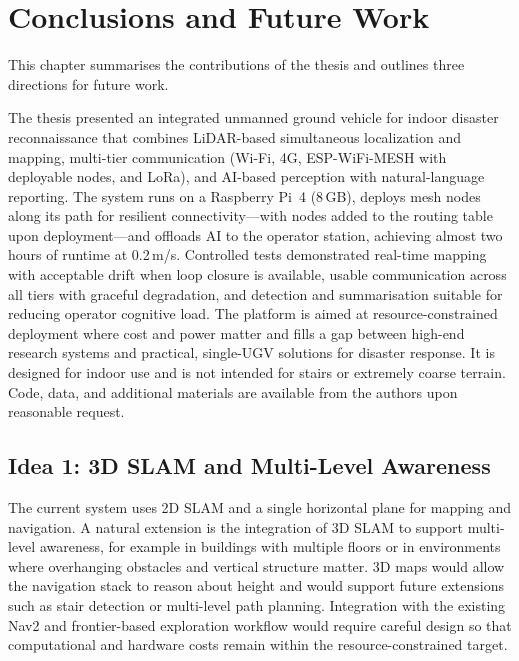 
\chapter{Conclusions and Future Work}

This chapter summarises the contributions of the thesis and outlines three directions for future work.

The thesis presented an integrated unmanned ground vehicle for indoor disaster reconnaissance that combines LiDAR-based simultaneous localization and mapping, multi-tier communication (Wi-Fi, 4G, ESP-WiFi-MESH with deployable nodes, and LoRa), and AI-based perception with natural-language reporting. The system runs on a Raspberry Pi~4 (8\,GB), deploys mesh nodes along its path for resilient connectivity---with nodes added to the routing table upon deployment---and offloads AI to the operator station, achieving almost two hours of runtime at 0.2\,m/s. Controlled tests demonstrated real-time mapping with acceptable drift when loop closure is available, usable communication across all tiers with graceful degradation, and detection and summarisation suitable for reducing operator cognitive load. The platform is aimed at resource-constrained deployment where cost and power matter and fills a gap between high-end research systems and practical, single-UGV solutions for disaster response. It is designed for indoor use and is not intended for stairs or extremely coarse terrain. Code, data, and additional materials are available from the authors upon reasonable request.

\section{Idea 1: 3D SLAM and Multi-Level Awareness}

The current system uses 2D SLAM and a single horizontal plane for mapping and navigation. A natural extension is the integration of 3D SLAM to support multi-level awareness, for example in buildings with multiple floors or in environments where overhanging obstacles and vertical structure matter. 3D maps would allow the navigation stack to reason about height and would support future extensions such as stair detection or multi-level path planning. Integration with the existing Nav2 and frontier-based exploration workflow would require careful design so that computational and hardware costs remain within the resource-constrained target.

